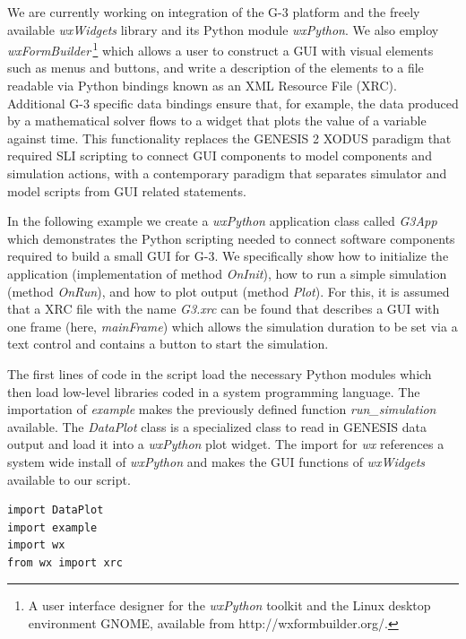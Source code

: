 \documentclass[12pt]{article}
\begin{document}
We are currently working on integration of the G-3 platform and the
freely available {\it wxWidgets} library and its Python module {\it
  wxPython}.
%
%
We also employ {\it wxFormBuilder}\,\footnote{A user interface
  designer for the {\it wxPython} toolkit and the Linux desktop
  environment GNOME, available from http://wxformbuilder.org/.} which
allows a user to construct a GUI with visual elements such as menus
and buttons, and write a description of the elements to a file
readable via Python bindings known as an XML Resource File (XRC).
Additional G-3 specific data bindings ensure that, for example, the
data produced by a mathematical solver flows to a widget that plots
the value of a variable against time.  This functionality replaces the
GENESIS 2 XODUS paradigm that required SLI scripting to connect GUI
components to model components and simulation actions, with a
contemporary paradigm that separates simulator and model scripts from
GUI related statements.

In the following example we create a {\it wxPython} application class
called {\it G3App} which demonstrates the Python scripting needed to
connect software components required to build a small GUI for
G-3.  We specifically show how to initialize the application
(implementation of method {\it OnInit}), how to run a simple
simulation (method {\it OnRun}), and how to plot output (method {\it
  Plot}).  For this, it is assumed that a XRC file with the name {\it
  G3.xrc} can be found that describes a GUI with one frame (here, {\it
  mainFrame}) which allows the simulation duration to be set via a
text control and contains a button to start the simulation.

The first lines of code in the script load the necessary Python
modules which then load low-level libraries coded in a system
programming language.  The importation of {\it example} makes the
previously defined function {\it run\_simulation} available.  The {\it
  DataPlot} class is a specialized class to read in GENESIS data
output and load it into a {\it wxPython} plot widget.  The import for
{\it wx} references a system wide install of {\it wxPython} and makes
the GUI functions of {\it wxWidgets} available to our script.

{\footnotesize
  \linenumbers*
\begin{verbatim}
import DataPlot
import example
import wx
from wx import xrc
\end{verbatim}
}
\end{document}
